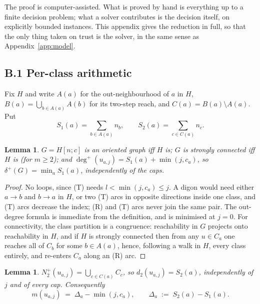 \documentclass[11pt]{amsart}
\newtheorem{lemma}[theorem]{Lemma}
\theoremstyle{remark}
\begin{document}
The proof is computer-assisted. What is proved by hand is everything up to a
finite decision problem; what a solver contributes is the decision itself, on
explicitly bounded instances. This appendix gives the reduction in full, so
that the only thing taken on trust is the solver, in the same sense as
Appendix~\ref{app:model}.

\subsection*{B.1 Per-class arithmetic}

Fix $H$ and write $A(a)$ for the out-neighbourhood of $a$ in $H$,
$B(a) = \bigcup_{b \in A(a)} A(b)$ for its two-step reach, and
$C(a) = B(a) \setminus A(a)$. Put
\[
S_1(a) = \sum_{b \in A(a)} n_b, \qquad S_2(a) = \sum_{c \in C(a)} n_c .
\]

\begin{lemma}\label{lem:blowwf}
$G = H[n;c]$ is an oriented graph iff $H$ is; $G$ is strongly connected iff
$H$ is (for $m \ge 2$); and
$\deg^+(u_{a,j}) = S_1(a) + \min(j, c_a)$, so
$\delta^+(G) = \min_a S_1(a)$, independently of the caps.
\end{lemma}

\begin{proof}
No loops, since (T) needs $l < \min(j,c_a) \le j$. A digon would need either
$a \to b$ and $b \to a$ in $H$, or two (T) arcs in opposite directions inside
one class, and (T) arcs decrease the index; (R) and (T) arcs never join the
same pair. The out-degree formula is immediate from the definition, and is
minimised at $j = 0$. For connectivity, the class partition is a congruence:
reachability in $G$ projects onto reachability in $H$, and if $H$ is strongly
connected then from any $u \in C_a$ one reaches all of $C_b$ for some
$b \in A(a)$, hence, following a walk in $H$, every class entirely, and
re-enters $C_a$ along an (R) arc.
\end{proof}

\begin{lemma}\label{lem:blown2}
$N_2^+(u_{a,j}) = \bigcup_{c \in C(a)} C_c$, so $d_2(u_{a,j}) = S_2(a)$,
independently of $j$ and of every cap. Consequently
\[
m(u_{a,j}) \;=\; \Delta_a - \min(j, c_a), \qquad
\Delta_a \;:=\; S_2(a) - S_1(a).
\]
\end{lemma}
\end{document}
